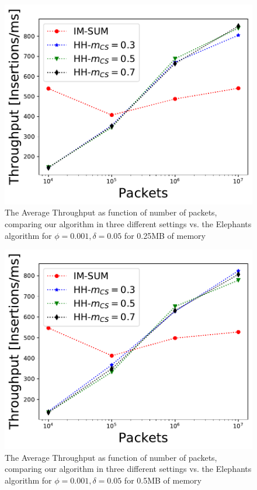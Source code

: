 \begin{figure}
    \includegraphics[width=\linewidth]{HH/figures/throughput_per_pkts_m=0.25.pdf}
    \caption[Average Throughput for 0.25MB of memory]{The Average Throughput as function of number of packets, comparing our algorithm in three different settings vs. the Elephants algorithm for $\phi=0.001,\delta=0.05$ for 0.25MB of memory}
    \label{fig:fig4_d}
\end{figure}
\begin{figure}
    \includegraphics[width=\linewidth]{HH/figures/throughput_per_pkts_m=0.5.pdf}
    \caption[Average Throughput for 0.5MB of memory]{The Average Throughput as function of number of packets, comparing our algorithm in three different settings vs. the Elephants algorithm for $\phi=0.001,\delta=0.05$ for 0.5MB of memory}
    \label{fig:fig4_e}
\end{figure}
